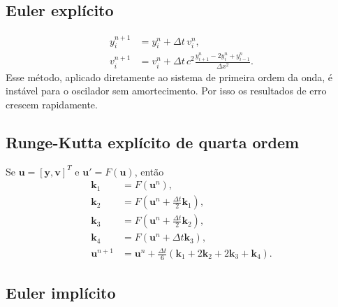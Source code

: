 \documentclass[12pt,a4paper]{article}
\begin{document}
\subsection{Euler explícito}

\begin{align}
    y_i^{n+1} &= y_i^n+\Delta t\,v_i^n,\\
    v_i^{n+1} &= v_i^n+\Delta t\,c^2
    \frac{y_{i+1}^n-2y_i^n+y_{i-1}^n}{\Delta x^2}.
\end{align}
Esse método, aplicado diretamente ao sistema de primeira ordem da onda, é instável para o oscilador sem amortecimento. Por isso os resultados de erro crescem rapidamente.

\subsection{Runge-Kutta explícito de quarta ordem}

Se $\mathbf{u}=[\mathbf{y},\mathbf{v}]^T$ e $\mathbf{u}'=F(\mathbf{u})$, então
\begin{align}
    \mathbf{k}_1 &= F(\mathbf{u}^n),\\
    \mathbf{k}_2 &= F(\mathbf{u}^n+\tfrac{\Delta t}{2}\mathbf{k}_1),\\
    \mathbf{k}_3 &= F(\mathbf{u}^n+\tfrac{\Delta t}{2}\mathbf{k}_2),\\
    \mathbf{k}_4 &= F(\mathbf{u}^n+\Delta t\mathbf{k}_3),\\
    \mathbf{u}^{n+1} &= \mathbf{u}^n+\frac{\Delta t}{6}
    (\mathbf{k}_1+2\mathbf{k}_2+2\mathbf{k}_3+\mathbf{k}_4).
\end{align}

\subsection{Euler implícito}
\end{document}
